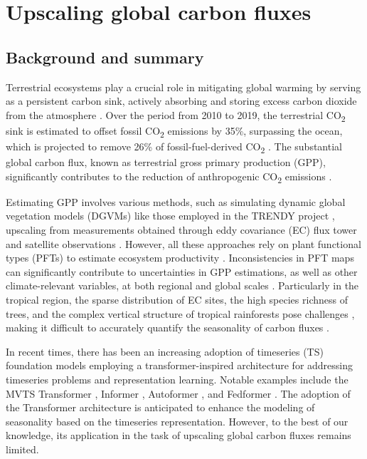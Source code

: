 \chapter{Upscaling global carbon fluxes} \label{chap6}
\renewcommand{\headrulewidth}{0pt}
\lhead[\thepage]{\leftmark}
\rhead[\leftmark]{\thepage}
\cfoot[]{}

\section{Background and summary}
Terrestrial ecosystems play a crucial role in mitigating global warming by serving as a persistent carbon sink, actively absorbing and storing excess carbon dioxide from the atmosphere \citep{pan2011large}. Over the period from 2010 to 2019, the terrestrial CO\textsubscript{2} sink is estimated to offset fossil CO\textsubscript{2} emissions by 35\%, surpassing the ocean, which is projected to remove 26\% of fossil-fuel-derived CO\textsubscript{2} \citep{friedlingstein2020global, wang2022disentangling}. The substantial global carbon flux, known as terrestrial gross primary production (GPP), significantly contributes to the reduction of anthropogenic CO\textsubscript{2} emissions \citep{beer2010terrestrial}. \par

Estimating GPP involves various methods, such as simulating dynamic global vegetation models (DGVMs) like those employed in the TRENDY project \citep{sitch2015recent, le2018global}, upscaling from measurements obtained through eddy covariance (EC) flux tower and satellite observations \citep{jung2019fluxcom, zeng2020global}. However, all these approaches rely on plant functional types (PFTs) to estimate ecosystem productivity \citep{poulter2011plant, poulter2015plant, lin2021improved, guo2023estimating, yan2023integrating}. Inconsistencies in PFT maps can significantly contribute to uncertainties in GPP estimations, as well as other climate-relevant variables, at both regional and global scales \citep{poulter2011plant}. Particularly in the tropical region, the sparse distribution of EC sites, the high species richness of trees, and the complex vertical structure of tropical rainforests pose challenges \citep{montgomery2001forest}, making it difficult to accurately quantify the seasonality of carbon fluxes \citep{xu2015satellite}. \par

In recent times, there has been an increasing adoption of timeseries (TS) foundation models employing a transformer-inspired architecture for addressing timeseries problems and representation learning. Notable examples include the MVTS Transformer \citep{zerveas2021transformer}, Informer \citep{zhou2021informer}, Autoformer \citep{wu2021autoformer}, and Fedformer \citep{zhou2022fedformer}. The adoption of the Transformer architecture is anticipated to enhance the modeling of seasonality based on the timeseries representation. However, to the best of our knowledge, its application in the task of upscaling global carbon fluxes remains limited. \par

